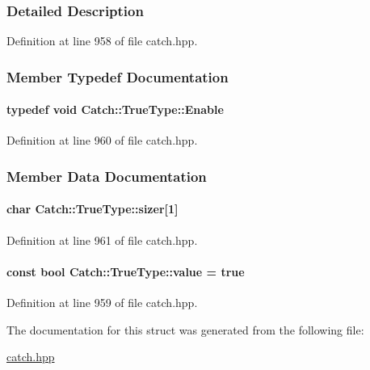 \subsubsection{Detailed Description}


Definition at line 958 of file catch.\+hpp.



\subsubsection{Member Typedef Documentation}
\hypertarget{a00090_a1c370b2ef39036c053357b868ef94a97}{}
\paragraph[{Enable}]{\setlength{\rightskip}{0pt plus 5cm}typedef void {\bf Catch\+::\+True\+Type\+::\+Enable}}\label{a00090_a1c370b2ef39036c053357b868ef94a97}


Definition at line 960 of file catch.\+hpp.



\subsubsection{Member Data Documentation}
\hypertarget{a00090_a8a7ed3be2e763d614e7d1f0cd18219d1}{}
\paragraph[{sizer}]{\setlength{\rightskip}{0pt plus 5cm}char Catch\+::\+True\+Type\+::sizer\mbox{[}1\mbox{]}}\label{a00090_a8a7ed3be2e763d614e7d1f0cd18219d1}


Definition at line 961 of file catch.\+hpp.

\hypertarget{a00090_ac7b4114d6c6d3d4ff8d2df67f243d2be}{}
\paragraph[{value}]{\setlength{\rightskip}{0pt plus 5cm}const bool Catch\+::\+True\+Type\+::value = true\hspace{0.3cm}{\ttfamily [static]}}\label{a00090_ac7b4114d6c6d3d4ff8d2df67f243d2be}


Definition at line 959 of file catch.\+hpp.



The documentation for this struct was generated from the following file\+:\begin{DoxyCompactItemize}
\item 
\hyperlink{a00094}{catch.\+hpp}\end{DoxyCompactItemize}
